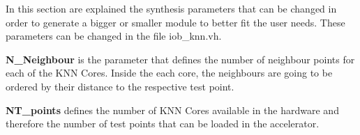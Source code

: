 In this section are explained the synthesis parameters that can be changed in
order to generate a bigger or smaller module to better fit the user needs.
These parameters can be changed in the file iob\_knn.vh.

\textbf{N\_Neighbour} is the parameter that defines the number of neighbour points for each of the KNN Cores. Inside the each core, the neighbours are going to be ordered by their distance to the respective test point.

\textbf{NT\_points} defines the number of KNN Cores available in the hardware and therefore the number of test points that can be loaded in the accelerator.
